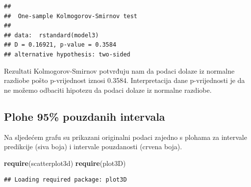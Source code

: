 \documentclass[]{article}
\newenvironment{Shaded}{\begin{snugshade}}{\end{snugshade}}
\newcommand{\KeywordTok}[1]{\textcolor[rgb]{0.13,0.29,0.53}{\textbf{{#1}}}}
\newcommand{\NormalTok}[1]{{#1}}
\begin{document}
\begin{verbatim}
## 
##  One-sample Kolmogorov-Smirnov test
## 
## data:  rstandard(model3)
## D = 0.16921, p-value = 0.3584
## alternative hypothesis: two-sided
\end{verbatim}

Rezultati Kolmogorov-Smirnov potvrđuju nam da podaci dolaze iz normalne
razdiobe pošto p-vrijednost iznosi 0.3584. Interpretacija dane
p-vrijednosti je da ne možemo odbaciti hipotezu da podaci dolaze iz
normalne razdiobe.

\subsection{Plohe 95\% pouzdanih
intervala}\label{plohe-95-pouzdanih-intervala}

Na sljedećem grafu su prikazani originalni podaci zajedno s plohama za
intervale predikcije (siva boja) i intervale pouzdanosti (crvena boja).

\begin{Shaded}
\begin{Highlighting}[]
\KeywordTok{require}\NormalTok{(scatterplot3d)}
\KeywordTok{require}\NormalTok{(plot3D)}
\end{Highlighting}
\end{Shaded}

\begin{verbatim}
## Loading required package: plot3D
\end{verbatim}
\end{document}
